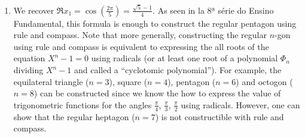 \begin{enumerate}
\item We recover
  $\Re x_1 = \cos\left(\frac{2\pi}{5}\right) = \frac{\sqrt{5} - 1}{4}$.
  As seen in la 8ª série do Ensino Fundamental, this formula is enough to
  construct the regular pentagon using rule and compass.
  Note that more generally, constructing the regular $n$-gon
  using rule and compass is equivalent to
  expressing the all roots of the equation $X^n - 1 = 0$ using
  radicals (or at least one root of a polynomial $\Phi_n$ dividing $X^n - 1$
  and called a ``cyclotomic polynomial'').
  For example, the equilateral triangle ($n=3$), square ($n=4$),
  pentagon ($n=6$) and octogon ($n=8$) can be constructed since we know the
  how to express the value of trigonometric functions for the angles
  $\frac{\pi}{4}$, $\frac{\pi}{3}$, $\frac{\pi}{2}$ using radicals. However,
  one can show that the regular heptagon ($n=7$) is not constructible
  with rule and compass.
\end{enumerate}
